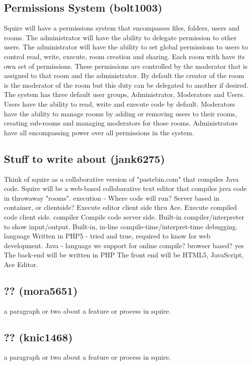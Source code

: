 \documentclass[11pt]{report}
\begin{document}
\begin{IDE-like Features}
\begin{}
\begin{Collaborative features that would be "nice":}
\subsection{Permissions System (bolt1003)}
Squire will have a permissions system that encompasses files, folders, users and rooms. The administrator will have the ability to delegate permission to other users.  The administrator will have the ability to set global permissions to users to control read, write, execute, room creation and sharing.  Each room with have its own set of permissions. These permissions are controlled by the moderator that is assigned to that room and the administrator. By default the creator of the room is the moderator of the room but this duty can be delegated to another if desired. The system has three default user groups, Administrator, Moderators and Users. Users have the ability to read, write and execute code by default. Moderators have the ability to manage rooms by adding or removing users to their rooms, creating sub-rooms and managing moderators for those rooms. Administrators have all encompassing power over all permissions in the system.

\subsection{Stuff to write about (jank6275)}
Think of squire as a collaborative version of "pastebin.com" that compiles Java code.
Squire will be a web-based collobarative text editor that compiles java code in throwaway "rooms".
execution - Where code will run? Server based in container, or clientside?
    Execute editor client side thru Ace.
    Execute compiled code client side.
compiler
    Compile code server side.
    Built-in compiler/interpreter to show input/output.
    Built-in, in-line compile-time/interpret-time debugging.
language
    Written in PHP5 - tried and true, required to know for web development.
    Java - language we support for online compile?
browser based?
    yes
    The back-end will be written in PHP
    The front end will be HTML5, JavaScript, Ace Editor.

\subsection{?? (mora5651)}
a paragraph or two about a feature or process in squire.

\subsection{?? (knic1468)}
a paragraph or two about a feature or process in squire.




\end{Collaborative features that would be "nice":}
\end{}
\end{IDE-like Features}
\end{document}

